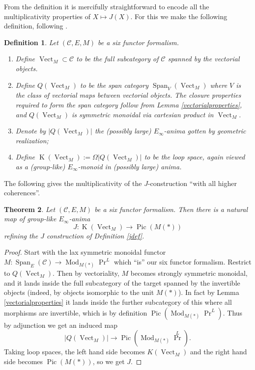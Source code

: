 \documentclass[12pt]{article}
\newtheorem{theorem}{Theorem}[section]
\newtheorem{definition}[theorem]{Definition}
\newcommand{\on}{\operatorname}
\newcommand{\mc}{\mathcal}
\begin{document}
From the definition it is mercifully straightforward to encode all the multiplicativity properties of $X\mapsto J(X)$.  For this we make the following definition, following \cite{QuillenQ}.

\begin{definition}\label{q}
Let $(\mc{C},E,M)$ be a six functor formalism.
\begin{enumerate}
\item Define $\on{Vect}_M\subset \mathcal{C}$ to be the full subcategory of $\mc{C}$ spanned by the vectorial objects.
\item Define $Q(\on{Vect}_M)$ to be the span category $\on{Span}_V(\on{Vect}_M)$ where $V$ is the class of vectorial maps between vectorial objects.  The closure properties required to form the span category follow from Lemma \ref{vectorialproperties}, and $Q(\on{Vect}_M)$ is symmetric monoidal via cartesian product in $\on{Vect}_M$.
\item Denote by $| Q(\on{Vect}_M) |$ the (possibly large) $E_\infty$-anima gotten by geometric realization;
\item Define $\on{K}(\on{Vect}_M) := \Omega | Q(\on{Vect}_M) |$ to be the loop space, again viewed as a (group-like) $E_\infty$-monoid in (possibly large) anima.
\end{enumerate}
\end{definition}


The following gives the multiplicativity of the $J$-construction ``with all higher coherences''.

\begin{theorem}\label{jcoherent}
Let $(\mc{C},E,M)$ be a six functor formalism.  Then there is a natural map of group-like $E_\infty$-anima
$$J:\on{K}(\on{Vect}_M)\to \on{Pic}(M(\ast))$$
refining the $J$ construction of Definition \ref{jdef}.
\end{theorem}
\begin{proof}
Start with the lax symmetric monoidal functor $M:\on{Span}_E(\mc{C})\to \on{Mod}_{M(\ast)}\on{Pr}^L$ which ``is'' our six functor formalism.  Restrict to $Q(\on{Vect}_M)$.  Then by vectoriality, $M$ becomes strongly symmetric monoidal, and it lands inside the full subcategory of the target spanned by the invertible objects (indeed, by objects isomorphic to the unit $M(\ast)$).  In fact by Lemma \ref{vectorialproperties} it lands inside the further subcategory of this where all morphisms are invertible, which is by definition $\on{Pic}(\on{Mod}_{M(\ast)}\on{Pr}^L)$.  Thus by adjunction we get an induced map
$$| Q(\on{Vect}_M) | \to \on{Pic}(\on{Mod}_{M(\ast)}\on{Pr}^L).$$
Taking loop spaces, the left hand side becomes $K(\on{Vect}_M)$ and the right hand side becomes $\on{Pic}(M(\ast))$, so we get $J$.
\end{proof}
\end{document}
